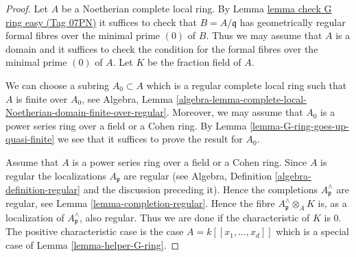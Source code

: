\documentclass{amsart}
\theoremstyle{plain}
\theoremstyle{definition}
\theoremstyle{remark}
\numberwithin{equation}{subsection}
\begin{document}
\begin{proof}
Let $A$ be a Noetherian complete local ring. By
Lemma \href{https://stacks.math.columbia.edu/tag/07PN}{lemma check G ring easy (Tag 07PN)}
it suffices to check that $B = A/\mathfrak q$ has geometrically regular
formal fibres over the minimal prime $(0)$ of $B$. Thus we may assume
that $A$ is a domain and it suffices to check the condition for
the formal fibres over the minimal prime $(0)$ of $A$.
Let $K$ be the fraction field of $A$.

\medskip\noindent
We can choose a subring $A_0 \subset A$ which is a regular complete local
ring such that $A$ is finite over $A_0$, see Algebra, Lemma
\ref{algebra-lemma-complete-local-Noetherian-domain-finite-over-regular}.
Moreover, we may assume that $A_0$ is a power series ring over a
field or a Cohen ring. By Lemma \ref{lemma-G-ring-goes-up-quasi-finite}
we see that it suffices to prove the result for $A_0$.

\medskip\noindent
Assume that $A$ is a power series ring over a field or a Cohen ring.
Since $A$ is regular the localizations $A_\mathfrak p$ are regular
(see Algebra, Definition \ref{algebra-definition-regular} and the
discussion preceding it).
Hence the completions $A_\mathfrak p^\wedge$ are regular, see
Lemma \ref{lemma-completion-regular}.
Hence the fibre $A_{\mathfrak p}^\wedge \otimes_A K$ is, as a localization
of $A_\mathfrak p^\wedge$, also regular. Thus we are done if the
characteristic of $K$ is $0$. The positive characteristic case
is the case $A = k[[x_1, \ldots, x_d]]$ which is a special case of
Lemma \ref{lemma-helper-G-ring}.
\end{proof}
\end{document}
